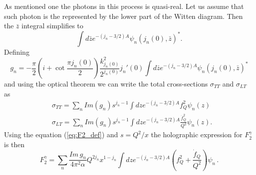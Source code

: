 \documentclass[preprint, 12pt]{elsarticle}
\begin{document}
As mentioned one the photons in this process is quasi-real. Let us assume that such photon is the represented by the lower part of the Witten diagram. Then the $\bar{z}$ integral simplifies to 
\begin{equation}
\int d\bar{z} e^{- \left(j_n - 3/2\right) A} {\psi_n \left(j_n\left(0\right), \bar{z}\right)}^{*}.
\end{equation}
Defining
\begin{equation}
g_n = - \frac{\pi}{2} \left( i + \cot \frac{\pi j_n\left(0\right)}{2} \right) \frac{k^2_{j_n\left(0\right)}}{2^{j_n\left(0\right)}} j_n'\left(0\right) \int d\bar{z} e^{- \left(j_n - 3/2\right) A} {\psi_n \left(j_n\left(0\right), \bar{z}\right)}^*
\label{eq:gn_def_gammagamma}
\end{equation}
and using the optical theorem we can write the total cross-sections $\sigma_{TT}$ and $\sigma_{LT}$ as
\begin{align}
&\sigma_{TT} =  \sum_n Im\left(g_n\right) s^{j_n - 1} \int dz e^{-\left(j_n - 3/2\right) A} f_Q^2 \psi_n\left(z\right) \\
&\sigma_{LT} =  \sum_n  Im\left(g_n\right) s^{j_n - 1} \int dz e^{-\left(j_n - 3/2\right) A} \frac{\dot{f}_Q^2}{Q^2} \psi_n\left(z\right).
\end{align}
Using the equation (\ref{eq:F2_def}) and $s  = Q^2 / x$ the holographic expression for $F_2^\gamma$ is then
\begin{equation}
F_2^\gamma = \sum_n \frac{ Im \, g_n}{4 \pi^2 \alpha} Q^{2 j_n} x^{1- j_n} \int dz e^{- \left( j_n - 3/2\right) A} \left( f_Q^2 + \frac{\dot{f}_Q}{Q^2} \right) \psi_n \,.
\end{equation}


\end{document}
